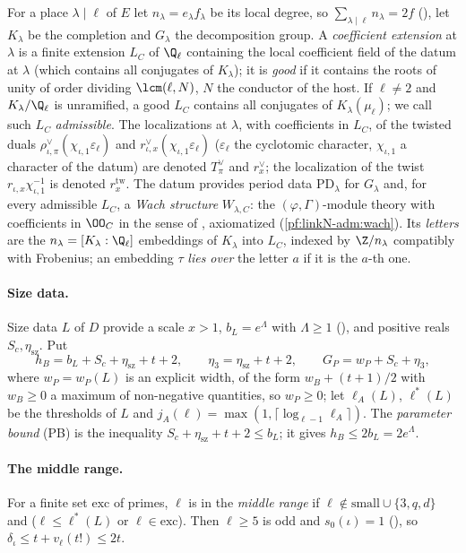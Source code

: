 For a place $\lambda\mid\ell$ of $E$ let $n_\lambda=e_\lambda f_\lambda$ be its local degree, so
$\sum_{\lambda\mid\ell}n_\lambda=2f$ (), let $K_\lambda$
be the completion and $G_\lambda$ the decomposition group. A \emph{coefficient extension} at $\lambda$ is a finite
extension $L_C$ of $\Q_\ell$ containing the local coefficient field of the datum at $\lambda$ (which contains all
conjugates of $K_\lambda$); it is \emph{good} if it contains the roots of unity of order dividing $\lcm(\ell,N)$, $N$ the
conductor of the host. If $\ell\ne2$ and $K_\lambda/\Q_\ell$ is unramified, a good $L_C$ contains all conjugates of
$K_\lambda(\mu_\ell)$; we call such $L_C$ \emph{admissible}. The
localizations at $\lambda$, with coefficients in $L_C$, of the twisted duals
$\rho^\vee_{\iota,\pi}(\chi_{\iota,1}\varepsilon_\ell)$ and $r^\vee_{\iota,x}(\chi_{\iota,1}\varepsilon_\ell)$
($\varepsilon_\ell$ the cyclotomic character, $\chi_{\iota,1}$ a character of the datum) are denoted $T^\vee_\pi$ and
$r^\vee_x$; the localization of the twist $r_{\iota,x}\chi_{\iota,1}^{-1}$ is denoted $r^{\mathrm{tw}}_x$. The datum
provides period data $\mathrm{PD}_\lambda$ for $G_\lambda$ and, for every admissible $L_C$, a \emph{Wach structure}
$W_{\lambda,C}$: the $(\varphi,\Gamma)$-module theory with coefficients in $\OO_C$ in the sense of
\cite{Wach1996,Berger2004}, axiomatized (\cref{pf:linkN-adm:wach}). Its \emph{letters} are the
$n_\lambda=[K_\lambda:\Q_\ell]$ embeddings of $K_\lambda$ into $L_C$, indexed by $\Z/n_\lambda$ compatibly with
Frobenius; an embedding $\tau$ \emph{lies over} the letter $a$ if it is the $a$-th one.

\paragraph{Size data.}
Size data $L$ of $D$ provide a scale $x>1$, $b_L=e^\Lambda$ with $\Lambda\ge1$
(), and positive reals $S_c,\eta_{\mathrm{sz}}$. Put
\[
h_B=b_L+S_c+\eta_{\mathrm{sz}}+t+2,\qquad \eta_3=\eta_{\mathrm{sz}}+t+2,\qquad G_P=w_P+S_c+\eta_3,
\]
where $w_P=w_P(L)$ is an explicit width, of the form $w_B+(t+1)/2$ with $w_B\ge0$ a maximum of non-negative
quantities, so $w_P\ge0$; let $\ell_A(L)$, $\ell^*(L)$ be the thresholds of $L$ and $j_A(\ell)=\max(1,\lceil
\log_{\ell-1}\ell_A\rceil)$. The \emph{parameter bound} (PB) is the inequality $S_c+\eta_{\mathrm{sz}}+t+2\le b_L$; it
gives $h_B\le2b_L=2e^\Lambda$.

\paragraph{The middle range.}
For a finite set $\mathrm{exc}$ of primes, $\ell$ is in the \emph{middle range} if
$\ell\notin\mathrm{small}\cup\{3,q,d\}$ and ($\ell\le\ell^*(L)$ or $\ell\in\mathrm{exc}$). Then $\ell\ge5$ is odd and
$s_0(\iota)=1$ (), so
$\delta_\iota\le t+v_\ell(t!)\le2t$.

